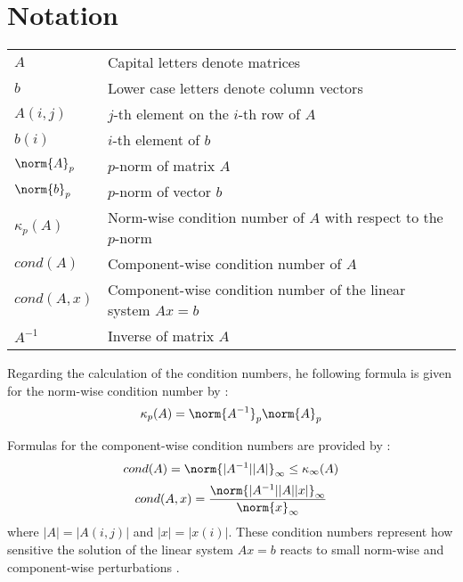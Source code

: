 \section{Notation}
\label{chap:notation}


\begin{tabular}{ll}
  $A$ & Capital letters denote matrices \\
  $b$ & Lower case letters denote column vectors \\
  $A(i,j)$ & $j$-th element on the $i$-th row of $A$ \\
  $b(i)$ & $i$-th element of $b$ \\
  $\norm{A}_p$ & $p$-norm of matrix $A$ \\
  $\norm{b}_p$ & $p$-norm of vector $b$ \\
  $\kappa_{p}(A)$ & Norm-wise condition number of $A$ with respect to the $p$-norm \\
  $cond(A)$ & Component-wise condition number of $A$ \\
  $cond(A, x)$ & Component-wise condition number of the linear system $Ax=b$ \\
  $A^{-1}$ & Inverse of matrix $A$ \\
\end{tabular}
\vspace{0.5cm}

\noindent Regarding the calculation of the condition numbers, he following formula is given for the norm-wise condition number by \cite{higham_accuracy_2002}:
\begin{equation}
\kappa_{p}(A) = \norm{A^{-1}}_p\norm{A}_p
\end{equation}

\noindent Formulas for the component-wise condition numbers are provided by \cite{skeel_scaling_1979}:
\begin{equation}
cond(A) = \norm{|A^{-1}||A|}_\infty \leq \kappa_{\infty}(A)
\end{equation}
\begin{equation}
cond(A,x) = \frac{\norm{|A^{-1}||A||x|}_\infty}{\norm{x}_\infty}
\end{equation}
\noindent where $|A| = |A(i,j)|$ and $|x| = |x(i)|$. These condition numbers represent how sensitive the solution of the linear system $Ax=b$ reacts to small norm-wise and component-wise perturbations \cite{higham_accuracy_2002}. 